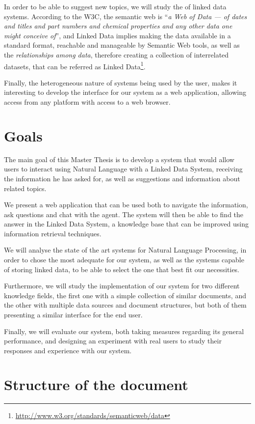 In order to be able to suggest new topics, we will study the of linked data systems. According to the W3C, the semantic web is ``\emph{a Web of Data — of dates and titles and part numbers and chemical properties and any other data one might conceive of}'', and Linked Data implies making the data available in a standard format, reachable and manageable by Semantic Web tools, as well as the \emph{relationships among data}, therefore creating a collection of interrelated datasets, that can be referred as Linked Data\footnote{\url{http://www.w3.org/standards/semanticweb/data}}.

Finally, the heterogeneous nature of systems being used by the user, makes it interesting to develop the interface for our system as a web application, allowing access from any platform with access to a web browser.

\section{Goals}

The main goal of this Master Thesis is to develop a system that would allow users to interact using Natural Language with a Linked Data System, receiving the information he has asked for, as well as suggestions and information about related topics.

We present a web application that can be used both to navigate the information, ask questions and chat with the agent. The system will then be able to find the answer in the Linked Data System, a knowledge base that can be improved using information retrieval techniques.

We will analyse the state of the art systems for Natural Language Processing, in order to chose the most adequate for our system, as well as the systems capable of storing linked data, to be able to select the one that best fit our necessities.

Furthermore, we will study the implementation of our system for two different knowledge fields, the first one with a simple collection of similar documents, and the other with multiple data sources and document structures, but both of them presenting a similar interface for the end user.

Finally, we will evaluate our system, both taking measures regarding its general performance, and designing an experiment with real users to study their responses and experience with our system.

\section{Structure of the document}

